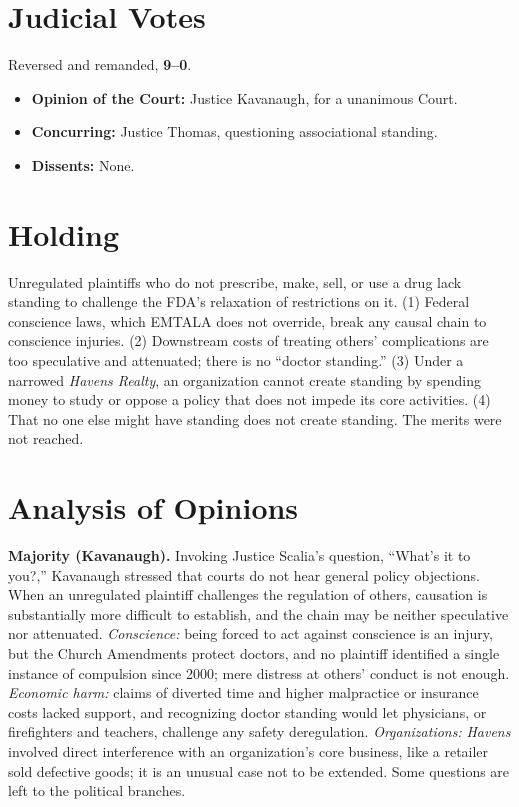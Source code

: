 \documentclass[12pt]{article}
\begin{document}
\section{Judicial Votes}

Reversed and remanded, \textbf{9--0}.
\begin{itemize}
\item \textbf{Opinion of the Court:} Justice Kavanaugh, for a unanimous Court.
\item \textbf{Concurring:} Justice Thomas, questioning associational standing.
\item \textbf{Dissents:} None.
\end{itemize}

\section{Holding}

Unregulated plaintiffs who do not prescribe, make, sell, or use a drug lack standing to challenge the FDA's relaxation of restrictions on it. (1) Federal conscience laws, which EMTALA does not override, break any causal chain to conscience injuries. (2) Downstream costs of treating others' complications are too speculative and attenuated; there is no ``doctor standing.'' (3) Under a narrowed \textit{Havens Realty}, an organization cannot create standing by spending money to study or oppose a policy that does not impede its core activities. (4) That no one else might have standing does not create standing. The merits were not reached.

\section{Analysis of Opinions}

\textbf{Majority (Kavanaugh).} Invoking Justice Scalia's question, ``What's it to you?,'' Kavanaugh stressed that courts do not hear general policy objections. When an unregulated plaintiff challenges the regulation of others, causation is substantially more difficult to establish, and the chain may be neither speculative nor attenuated. \emph{Conscience:} being forced to act against conscience is an injury, but the Church Amendments protect doctors, and no plaintiff identified a single instance of compulsion since 2000; mere distress at others' conduct is not enough. \emph{Economic harm:} claims of diverted time and higher malpractice or insurance costs lacked support, and recognizing doctor standing would let physicians, or firefighters and teachers, challenge any safety deregulation. \emph{Organizations:} \textit{Havens} involved direct interference with an organization's core business, like a retailer sold defective goods; it is an unusual case not to be extended. Some questions are left to the political branches.
\end{document}
